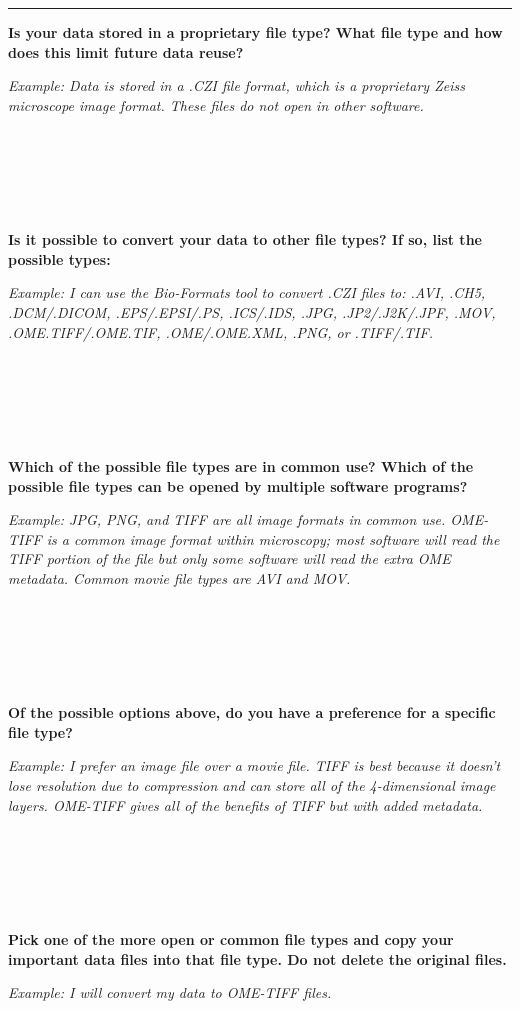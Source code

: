 \documentclass[
]{book}
\begin{document}
\begin{center}\rule{0.5\linewidth}{0.5pt}\end{center}

\textbf{Is your data stored in a proprietary file type? What file type and how does this limit future data reuse?}

\emph{Example: Data is stored in a .CZI file format, which is a proprietary Zeiss microscope image format. These files do not open in other software.}

~

~

~

\textbf{Is it possible to convert your data to other file types? If so, list the possible types:}

\emph{Example: I can use the Bio-Formats tool to convert .CZI files to: .AVI, .CH5, .DCM/.DICOM, .EPS/.EPSI/.PS, .ICS/.IDS, .JPG, .JP2/.J2K/.JPF, .MOV, .OME.TIFF/.OME.TIF, .OME/.OME.XML, .PNG, or .TIFF/.TIF.}

~

~

~

\textbf{Which of the possible file types are in common use? Which of the possible file types can be opened by multiple software programs?}

\emph{Example: JPG, PNG, and TIFF are all image formats in common use. OME-TIFF is a common image format within microscopy; most software will read the TIFF portion of the file but only some software will read the extra OME metadata. Common movie file types are AVI and MOV.}

~

~

~

\textbf{Of the possible options above, do you have a preference for a specific file type?}

\emph{Example: I prefer an image file over a movie file. TIFF is best because it doesn't lose resolution due to compression and can store all of the 4-dimensional image layers. OME-TIFF gives all of the benefits of TIFF but with added metadata.}

~

~

~

\textbf{Pick one of the more open or common file types and copy your important data files into that file type. Do not delete the original files.}

\emph{Example: I will convert my data to OME-TIFF files.}
\end{document}
